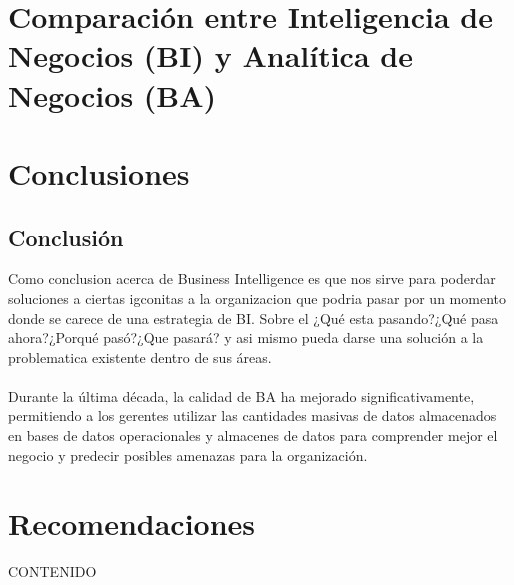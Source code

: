 \documentclass[preprint,12pt]{elsarticle}
\begin{document}

\section{Comparación entre Inteligencia de Negocios (BI) y Analítica de Negocios (BA)}


\section{Conclusiones}
\subsection{Conclusión }	
Como conclusion acerca de Business Intelligence es que nos sirve para poderdar soluciones a ciertas igconitas a la organizacion que 
podria pasar por un momento donde se carece de una estrategia de BI.
Sobre el ¿Qué esta pasando?¿Qué pasa ahora?¿Porqué pasó?¿Que pasará? y asi mismo pueda darse una solución a la problematica 
existente dentro de sus áreas.\\\\
Durante la última década, la calidad de BA ha mejorado significativamente, permitiendo a los gerentes utilizar las cantidades masivas de datos almacenados en bases de datos operacionales y almacenes de datos para comprender mejor el negocio y predecir posibles amenazas para la organización.




\section{Recomendaciones}	
CONTENIDO






	
	\newpage
	
		


\end{document}

